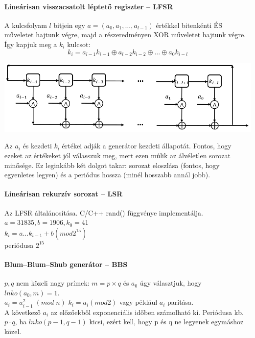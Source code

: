 \paragraph{Lineárisan visszacsatolt léptető regiszter -- LFSR}
A kulcsfolyam $l$ bitjein egy $a = (a_0,a_1,\dots,a_{l-1})$ értékkel bitenkénti ÉS műveletet hajtunk végre, majd a részeredményen XOR műveletet hajtunk végre. Így kapjuk meg a $k_i$ kulcsot:
$$ k_i = a_{l-1}k_{i-1}\oplus a_{l-2}k_{i-2}\oplus\dots\oplus a_{0}k_{i-l}$$
\begin{center}
	\includegraphics[width=0.7\linewidth]{fig/14-LFSR}
\end{center}
Az $a_i$ és kezdeti $k_i$ értékei adják a generátor kezdeti állapotát. Fontos, hogy ezeket az értékeket jól válasszuk meg, mert ezen múlik az álvéletlen sorozat minősége. Ez leginkább két dolgot takar: sorozat eloszlása (fontos, hogy egyenletes legyen) és a periódus hossza (minél hosszabb annál jobb).
\paragraph{Lineárisan rekurzív sorozat -- LSR}
Az LFSR általánosítása. C/C++ rand() függvénye implementálja.\\
$a = 31835, b = 1906, k_0 = 41$\\
$k_i = a \dots k_{i-1} + b (mod 2^{15})$\\
periódusa $2^{15}$
\paragraph{Blum--Blum--Shub generátor -- BBS}
$p, q$ nem közeli nagy prímek: $m = p\times q$ és $a_0$ úgy választjuk, hogy $lnko(a_0,m)=1$.\\
$a_i = a_{i-1}^2 \;(mod\; n)$
$k_i = a_i(mod 2)$ vagy például $a_i$ paritása.\\
A következő $a_i$ az előzőekből exponenciális időben számolható ki. Periódusa kb. $p\cdot q$, ha $lnko(p-1,q-1)$ kicsi, ezért kell, hogy p és q ne legyenek egymáshoz közel.
